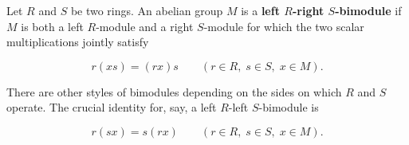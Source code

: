 Let $R$ and $S$ be two rings. An abelian group $M$ is a \textbf{left $R$-right $S$-bimodule} if $M$ is both a left $R$-module and a right $S$-module for which the two scalar multiplications jointly satisfy

$$r(xs) = (rx)s \qquad (r \in R,\; s \in S,\; x \in M).$$

There are other styles of bimodules depending on the sides on which $R$ and $S$ operate. The crucial identity for, say, a left $R$-left $S$-bimodule is

$$r(sx) = s(rx) \qquad (r \in R,\; s \in S,\; x \in M).$$
